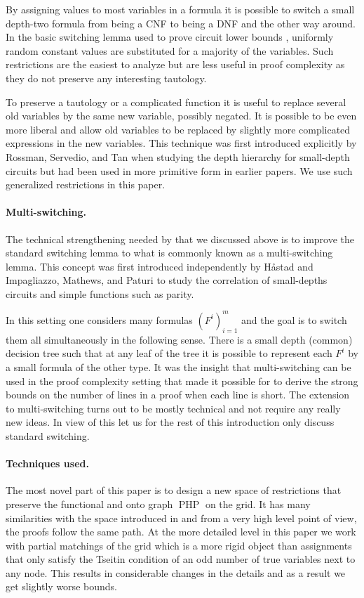 \documentclass{theoretics}
\DeclareMathOperator{\PHP}{PHP}
\begin{document}
By assigning values to most variables in a formula it is
possible to switch a small depth-two formula from being
a CNF to being a DNF and the other way around.
In the basic switching lemma used to prove circuit lower bounds
\cite{fss,yao, jhswitch}, uniformly random constant values 
are substituted
for a majority of the variables.  Such restrictions
are the easiest to analyze but are less useful in 
proof complexity as they do not preserve any interesting tautology.

To preserve a tautology or a complicated
function it is useful to replace several old
variables by the same new variable, possibly negated.
It is possible to be even more liberal and allow 
old variables to be replaced by slightly more complicated
expressions in the new variables.  This technique
was first introduced explicitly by Rossman, Servedio,
and Tan \cite{rst} when studying the depth hierarchy
for small-depth circuits but had been used
in more primitive form in earlier papers.
We use such generalized restrictions in this paper.

\paragraph{Multi-switching.}
The technical strengthening needed by \cite{PRT21} that
we discussed above is to improve the standard switching
lemma to what is commonly
known as a multi-switching lemma.  This concept was first introduced 
independently by H{\aa}stad \cite{jhmultiswitch}
and Impagliazzo, Mathews, and Paturi \cite{imp} to
study the correlation of small-depths circuits and 
simple functions such as parity.

In this setting one considers many formulas $(F^i)_{i=1}^m$
and the goal is to switch them all simultaneously
in the following sense.  There is a small depth (common)
decision tree such that at any leaf of the tree it
is possible to represent each $F^i$ by a small
formula of the other type.
It was the insight that multi-switching
can be used in the proof complexity setting that
made it possible for \cite{PRT21} to derive the
strong bounds on the number of lines in a proof
when each line is short.   The extension to
multi-switching turns out to be mostly technical
and not require any really new ideas.  In view
of this let us for the rest of this introduction
only discuss standard switching.

\paragraph{Techniques used.}
The most novel part of this paper is to design a new space
of restrictions that preserve the functional and
onto graph $\PHP$ on the grid.  It has many similarities
with the space introduced in \cite{jhtseitin}
and from a very high level point of view, the
proofs follow the same path.  At the more detailed
level in this paper we work with partial
matchings of the grid which is a more rigid
object than assignments that only satisfy the 
Tseitin condition of an odd number of true
variables next to any node.  This results
in considerable changes in the details
and as a result we get slightly worse bounds.
\end{document}
